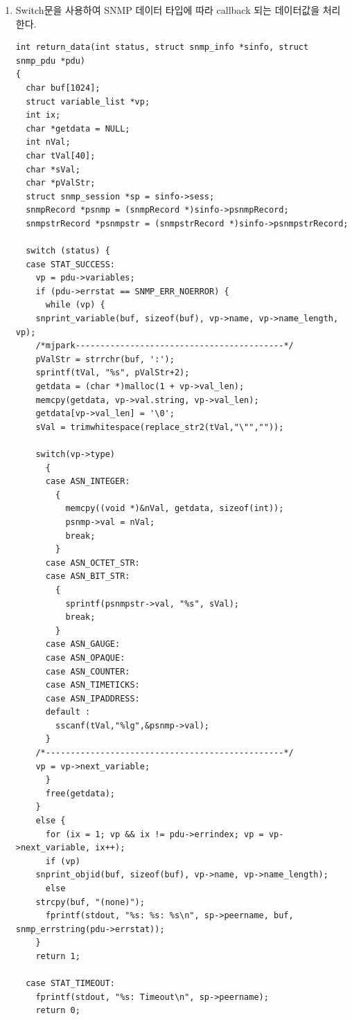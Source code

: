 \documentclass[11pt
  , a4paper
  , article
  , oneside
]{memoir}
\begin{document}
\begin{enumerate}
\begin{lstlisting}[style=termstyle]
                                                    /* parse the oids */
  if (!read_objid(psnmp->oids, snmpinfo->oid_info.Oid, &snmpinfo->oid_info.OidLen))      
    {
      printf("parse the oids %s\n",psnmp->oids);
      snmp_perror("read_objid");
      exit(1);
    }
}
\end{lstlisting}

\item Switch문을 사용하여 SNMP 데이터 타입에 따라 callback 되는 데이터값을 처리한다.

\begin{lstlisting}[style=termstyle]
int return_data(int status, struct snmp_info *sinfo, struct snmp_pdu *pdu)               
{
  char buf[1024];
  struct variable_list *vp;
  int ix;
  char *getdata = NULL;
  int nVal;
  char tVal[40];
  char *sVal;
  char *pValStr;
  struct snmp_session *sp = sinfo->sess;
  snmpRecord *psnmp = (snmpRecord *)sinfo->psnmpRecord;
  snmpstrRecord *psnmpstr = (snmpstrRecord *)sinfo->psnmpstrRecord;

  switch (status) {
  case STAT_SUCCESS:
    vp = pdu->variables;
    if (pdu->errstat == SNMP_ERR_NOERROR) {
      while (vp) {
	snprint_variable(buf, sizeof(buf), vp->name, vp->name_length, vp);
	/*mjpark------------------------------------------*/
	pValStr = strrchr(buf, ':');
	sprintf(tVal, "%s", pValStr+2);
	getdata = (char *)malloc(1 + vp->val_len);
	memcpy(getdata, vp->val.string, vp->val_len);
	getdata[vp->val_len] = '\0';
	sVal = trimwhitespace(replace_str2(tVal,"\"","")); 

	switch(vp->type)
	  {
	  case ASN_INTEGER:
	    {
	      memcpy((void *)&nVal, getdata, sizeof(int));
	      psnmp->val = nVal;
	      break;
	    }
	  case ASN_OCTET_STR:
	  case ASN_BIT_STR:
	    {
	      sprintf(psnmpstr->val, "%s", sVal);
	      break;
	    }
	  case ASN_GAUGE:
	  case ASN_OPAQUE:
	  case ASN_COUNTER:
	  case ASN_TIMETICKS:
	  case ASN_IPADDRESS:
	  default :
	    sscanf(tVal,"%lg",&psnmp->val);
	  }
	/*------------------------------------------------*/
	vp = vp->next_variable;
      }
      free(getdata);
    }
    else {
      for (ix = 1; vp && ix != pdu->errindex; vp = vp->next_variable, ix++);
      if (vp)
	snprint_objid(buf, sizeof(buf), vp->name, vp->name_length);
      else
	strcpy(buf, "(none)");
      fprintf(stdout, "%s: %s: %s\n", sp->peername, buf, snmp_errstring(pdu->errstat));
    }
    return 1;
    
  case STAT_TIMEOUT:
    fprintf(stdout, "%s: Timeout\n", sp->peername);
    return 0;
  

\end{lstlisting}
\end{enumerate}
\end{document}
